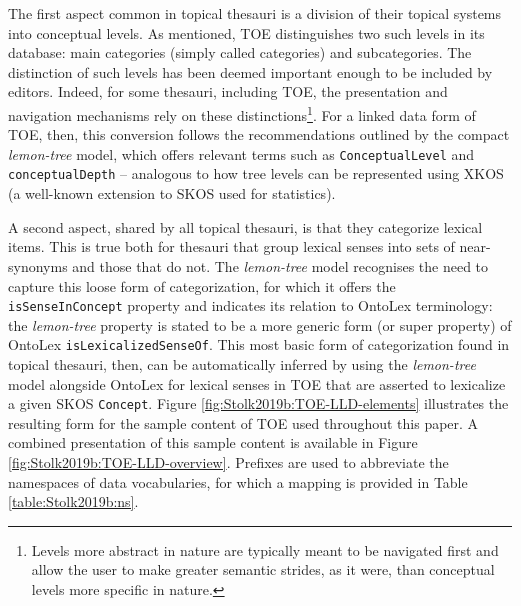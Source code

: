 The first aspect common in topical thesauri is a division of their topical systems into conceptual levels. As mentioned, TOE distinguishes two such levels in its database: main categories (simply called categories) and subcategories. The distinction of such levels has been deemed important enough to be included by editors. Indeed, for some thesauri, including TOE, the presentation and navigation mechanisms rely on these distinctions\footnote{Levels more abstract in nature are typically meant to be navigated first and allow the user to make greater semantic strides, as it were, than conceptual levels more specific in nature.}. For a linked data form of TOE, then, this conversion follows the recommendations outlined by the compact \textit{lemon-tree} model, which offers relevant terms such as  \texttt{ConceptualLevel} and  \texttt{conceptualDepth} – analogous to how tree levels can be represented using XKOS (a well-known extension to SKOS used for statistics).

A second aspect, shared by all topical thesauri, is that they categorize lexical items. This is true both for thesauri that group lexical senses into sets of near-synonyms and those that do not. The \textit{lemon-tree} model recognises the need to capture this loose form of categorization, for which it offers the  \texttt{isSenseInConcept} property and indicates its relation to OntoLex terminology: the \textit{lemon-tree} property is stated to be a more generic form (or super property) of OntoLex  \texttt{isLexicalizedSenseOf}. This most basic form of categorization found in topical thesauri, then, can be automatically inferred by using the \textit{lemon-tree} model alongside OntoLex for lexical senses in TOE that are asserted to lexicalize a given SKOS \texttt{Concept}. Figure \ref{fig:Stolk2019b:TOE-LLD-elements} illustrates the resulting form for the sample content of TOE used throughout this paper. A combined presentation of this sample content is available in Figure \ref{fig:Stolk2019b:TOE-LLD-overview}. Prefixes are used to abbreviate the namespaces of data vocabularies, for which a mapping is provided in Table \ref{table:Stolk2019b:ns}.

